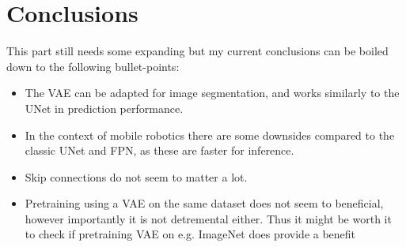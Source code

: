 \chapter{Conclusions}\label{chapter:conclusions}

This part still needs some expanding but my current conclusions can be boiled down to the following bullet-points:
\begin{itemize}
    \item The VAE can be adapted for image segmentation, and works similarly to the UNet in prediction performance.
    \item In the context of mobile robotics there are some downsides compared to the classic UNet and FPN, as these are faster for inference.
    \item Skip connections do not seem to matter a lot.
    \item Pretraining using a VAE on the same dataset does not seem to beneficial, however importantly it is not detremental either. Thus it might be worth it to check if pretraining VAE on e.g. ImageNet does provide a benefit
\end{itemize}